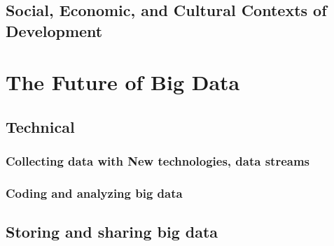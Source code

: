 \documentclass[letterpaper,man,apacite]{apa6}
\begin{document}
\subsection{Social, Economic, and Cultural Contexts of Development}


\section{The Future of Big Data}

\subsection{Technical}

\subsubsection{Collecting data with New technologies, data streams}

\subsubsection{Coding and analyzing big data}

\subsection{Storing and sharing big data}
\end{document}
